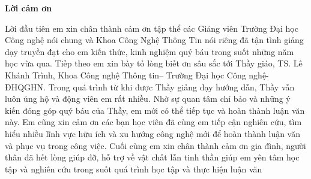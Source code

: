 \begin{center}
\textbf{\large{Lời cảm ơn}	}
\end{center}
 Lời đầu tiên em xin chân thành cảm ơn tập thể các Giảng viên Trường Đại học Công
 nghệ nói chung và Khoa Công Nghệ Thông Tin nói riêng đã tận tình giảng dạy
 truyền đạt cho em kiến thức, kinh nghiệm quý báu trong suốt những năm học vừa
 qua.\nl
 \indent Tiếp theo em xin bày tỏ lòng biết ơn sâu sắc tới Thầy giáo, TS. Lê Khánh
 Trình, Khoa Công nghệ Thông tin– Trường Đại học Công nghệ- ĐHQGHN. Trong
 quá trình từ khi được Thầy giảng dạy hướng dẫn, Thầy vẫn luôn ủng hộ và động
 viên em rất nhiều. Nhờ sự quan tâm chỉ bảo và những ý kiến đóng góp quý báu
 của Thầy, em mới có thể tiếp tục và hoàn thành luận văn này.\nl
 \indent Em cũng xin cảm ơn các bạn học viên đã cùng em tiếp cận nghiên cứu, tìm
 hiểu nhiều lĩnh vực hữu ích và xu hướng công nghệ mới để hoàn thành luận văn
 và phục vụ trong công việc.\nl
 \indent Cuối cùng em xin chân thành cảm ơn gia đình, người thân đã hết lòng giúp
 đỡ, hỗ trợ về vật chất lẫn tinh thần giúp em yên tâm học tập và nghiên cứu trong
 suốt quá trình học tập và thực hiện luận văn